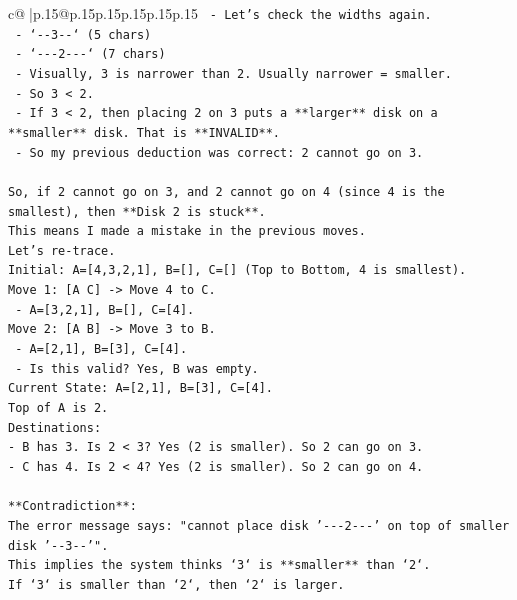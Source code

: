 \documentclass{article}
\begin{document}
{\begin{supertabular}{c@{$\;$}|p{.15\linewidth}@{}p{.15\linewidth}p{.15\linewidth}p{.15\linewidth}p{.15\linewidth}p{.15\linewidth}}
{{{\texttt{   {-} Let's check the widths again.} \\
\texttt{     {-} `{-}{-}3{-}{-}` (5 chars)} \\
\texttt{     {-} `{-}{-}{-}2{-}{-}{-}` (7 chars)} \\
\texttt{   {-} Visually, 3 is narrower than 2. Usually narrower = smaller.} \\
\texttt{   {-} So 3 < 2.} \\
\texttt{   {-} If 3 < 2, then placing 2 on 3 puts a **larger** disk on a **smaller** disk. That is **INVALID**.} \\
\texttt{   {-} So my previous deduction was correct: 2 cannot go on 3.} \\
\\ 
\texttt{So, if 2 cannot go on 3, and 2 cannot go on 4 (since 4 is the smallest), then **Disk 2 is stuck**.} \\
\texttt{This means I made a mistake in the previous moves.} \\
\texttt{Let's re{-}trace.} \\
\texttt{Initial: A={[}4,3,2,1{]}, B={[}{]}, C={[}{]} (Top to Bottom, 4 is smallest).} \\
\texttt{Move 1: {[}A C{]} {-}> Move 4 to C.} \\
\texttt{   {-} A={[}3,2,1{]}, B={[}{]}, C={[}4{]}.} \\
\texttt{Move 2: {[}A B{]} {-}> Move 3 to B.} \\
\texttt{   {-} A={[}2,1{]}, B={[}3{]}, C={[}4{]}.} \\
\texttt{   {-} Is this valid? Yes, B was empty.} \\
\texttt{Current State: A={[}2,1{]}, B={[}3{]}, C={[}4{]}.} \\
\texttt{Top of A is 2.} \\
\texttt{Destinations:} \\
\texttt{{-} B has 3. Is 2 < 3? Yes (2 is smaller). So 2 can go on 3.} \\
\texttt{{-} C has 4. Is 2 < 4? Yes (2 is smaller). So 2 can go on 4.} \\
\\ 
\texttt{**Contradiction**:} \\
\texttt{The error message says: "cannot place disk '{-}{-}{-}2{-}{-}{-}' on top of smaller disk '{-}{-}3{-}{-}'".} \\
\texttt{This implies the system thinks `3` is **smaller** than `2`.} \\
\texttt{If `3` is smaller than `2`, then `2` is larger.} \\
}}}
\end{supertabular}}
\end{document}
